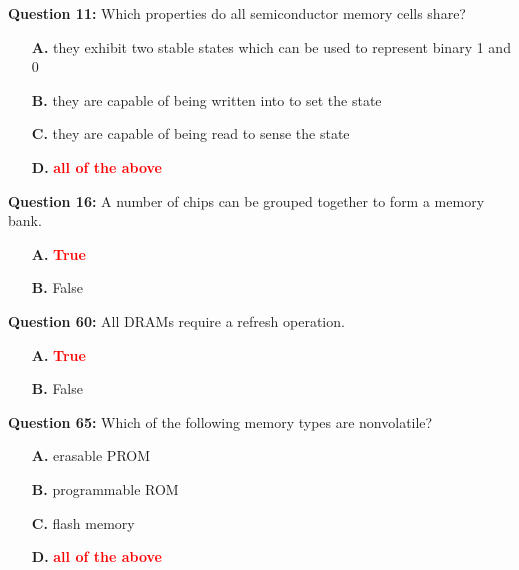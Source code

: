 \documentclass[12pt,a4paper]{article}
\begin{document}
\vspace{0.5cm}

\vspace{0.5cm}

\textbf{Question 11:} Which properties do all semiconductor memory cells share?

\begin{itemize}
    \item[\textbf{A.}] they exhibit two stable states which can be used to represent binary 1 and 0
    \item[\textbf{B.}] they are capable of being written into to set the state
    \item[\textbf{C.}] they are capable of being read to sense the state
    \item[\textbf{D.}] \textcolor{red}{\textbf{all of the above}}
\end{itemize}

\vspace{0.5cm}

\vspace{0.5cm}

\textbf{Question 16:} A number of chips can be grouped together to form a memory bank.

\begin{itemize}
    \item[\textbf{A.}] \textcolor{red}{\textbf{True}}
    \item[\textbf{B.}] False
\end{itemize}

\vspace{0.5cm}

\vspace{0.5cm}

\textbf{Question 60:} All DRAMs require a refresh operation.

\begin{itemize}
    \item[\textbf{A.}] \textcolor{red}{\textbf{True}}
    \item[\textbf{B.}] False
\end{itemize}

\vspace{0.5cm}

\vspace{0.5cm}

\textbf{Question 65:} Which of the following memory types are nonvolatile?

\begin{itemize}
    \item[\textbf{A.}] erasable PROM
    \item[\textbf{B.}] programmable ROM
    \item[\textbf{C.}] flash memory
    \item[\textbf{D.}] \textcolor{red}{\textbf{all of the above}}
\end{itemize}
\end{document}
